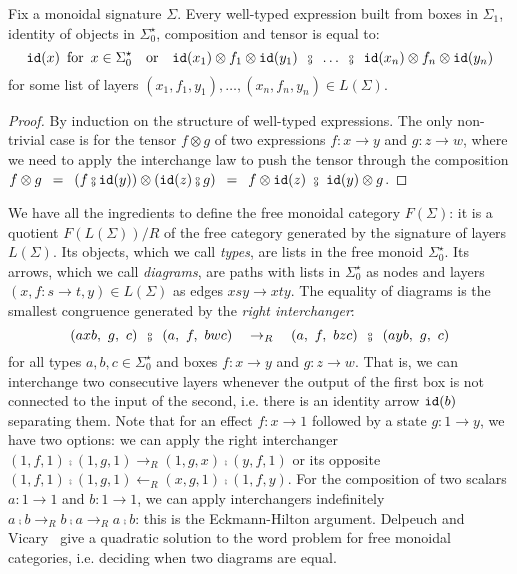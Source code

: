\begin{lemma}
Fix a monoidal signature $\Sigma$.
Every well-typed expression built from boxes in $\Sigma_1$, identity of objects in $\Sigma_0^\star$, composition and tensor is equal to:
$$
\id(x) \s \text{for} \s x \in \Sigma_0^\star \quad \text{or} \quad
\id(x_1) \otimes f_1 \otimes \id(y_1)
\s \fcmp \s \dots \s \fcmp \s
\id(x_n) \otimes f_n \otimes \id(y_n)$$
for some list of layers $(x_1, f_1, y_1), \dots, (x_n, f_n, y_n) \in L(\Sigma)$.
\end{lemma}

\begin{proof}
By induction on the structure of well-typed expressions.
The only non-trivial case is for the tensor $f \otimes g$ of two expressions $f : x \to y$ and $g : z \to w$, where we need to apply the interchange law to push the tensor through the composition $f \otimes g \s = \s (f \fcmp \id(y)) \otimes (\id(z) \fcmp g) \s = \s f \otimes \id(z) \ \fcmp \ \id(y) \otimes g$.
\end{proof}

We have all the ingredients to define the free monoidal category $F(\Sigma)$: it is a quotient $F(L(\Sigma)) / R$ of the free category generated by the signature of layers $L(\Sigma)$.
Its objects, which we call \emph{types}, are lists in the free monoid $\Sigma_0^\star$.
Its arrows, which we call \emph{diagrams}, are paths with lists in $\Sigma_0^\star$ as nodes and layers $(x, f : s \to t, y) \in L(\Sigma)$ as edges $x s y \to x t y$.
The equality of diagrams is the smallest congruence generated by the \emph{right interchanger}:
$$
(a x b, \ g, \ c) \s \fcmp \s (a, \ f, \ b w c)
\quad \to_R \quad
(a, \ f, \ b z c) \s \fcmp \s (a y b, \ g, \ c)
$$
for all types $a, b, c \in \Sigma_0^\star$ and boxes $f : x \to y$ and $g : z \to w$.
That is, we can interchange two consecutive layers whenever the output of the first box is not connected to the input of the second, i.e. there is an identity arrow $\mathtt{id}(b)$ separating them.
Note that for an effect $f : x \to 1$ followed by a state $g : 1 \to y$, we have two options: we can apply the right interchanger $(1, f, 1) \fcmp (1, g, 1) \to_R (1, g, x) \fcmp (y, f, 1)$ or its opposite $(1, f, 1) \fcmp (1, g, 1) \leftarrow_R (x, g, 1) \fcmp (1, f, y)$.
For the composition of two scalars $a : 1 \to 1$ and $b : 1 \to 1$, we can apply interchangers indefinitely $a \fcmp b \to_R b \fcmp a \to_R a \fcmp b$: this is the Eckmann-Hilton argument.
Delpeuch and Vicary~\cite{DelpeuchVicary18} give a quadratic solution to the word problem for free monoidal categories, i.e. deciding when two diagrams are equal.

